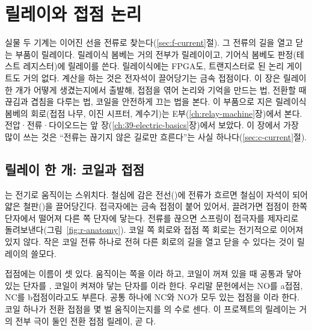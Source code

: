 \chapter{릴레이와 접점 논리}\label{ch:relay}

실물 두 기계는 이어진 선을 전류로 찾는다(\ref{sec:f-current}절). 그 전류의 길을 열고 닫는 부품이 릴레이다.
릴레이식 봄베는 거의 전부가 릴레이이고, 기어식 봄베도 판정(테스트 레지스터)에 릴레이를 쓴다. 릴레이식에는
FPGA도, 트랜지스터로 된 논리 게이트도 거의 없다. 계산을 하는 것은 전자석이 끌어당기는 금속 접점이다.
이 장은 릴레이 한 개가 어떻게 생겼는지에서 출발해, 접점을 엮어 논리와 기억을 만드는 법, 전환할 때 끊김과 겹침을
다루는 법, 코일을 안전하게 끄는 법을 본다. 이 부품으로 지은 릴레이식 봄베의 회로(접점 나무, 이진 시프터, 계수기)는
E부(\ref{ch:relay-machine}장)에서 본다. 전압·전류·다이오드는 앞 장(\ref{ch:39-electric-basics}장)에서 보았다.
이 장에서 가장 많이 쓰는 것은 ``전류는 끊기지 않은 길로만 흐른다''는 사실 하나다(\ref{sec:c-current}절).

\section{릴레이 한 개: 코일과 접점}\label{sec:relay-one}

\Why {}는 전기로 움직이는 스위치다. 철심에 감은 전선()에 전류가 흐르면
철심이 자석이 되어 얇은 철판()을 끌어당긴다. 접극자에는 금속 접점이 붙어 있어서,
끌려가면 접점이 한쪽 단자에서 떨어져 다른 쪽 단자에 닿는다. 전류를 끊으면 스프링이 접극자를 제자리로
돌려보낸다(그림~\ref{fig:r-anatomy}). 코일 쪽 회로와 접점 쪽 회로는 전기적으로 이어져 있지 않다. 작은 코일
전류 하나로 전혀 다른 회로의 길을 열고 닫을 수 있다는 것이 릴레이의 쓸모다.

접점에는 이름이 셋 있다. 움직이는 쪽을 이라 하고, 코일이 꺼져 있을 때 공통과 닿아 있는
단자를 , 코일이 켜져야 닿는 단자를 이라
한다. 우리말 문헌에서는 NO를 a접점, NC를 b접점이라고도 부른다. 공통 하나에 NC와 NO가 모두 있는 접점을
이라 한다. 코일 하나가 전환 접점을 몇 벌 움직이는지를 의
수로 센다. 이 프로젝트의 릴레이는 거의 전부 극이 둘인 전환 접점 릴레이, 곧 다.

